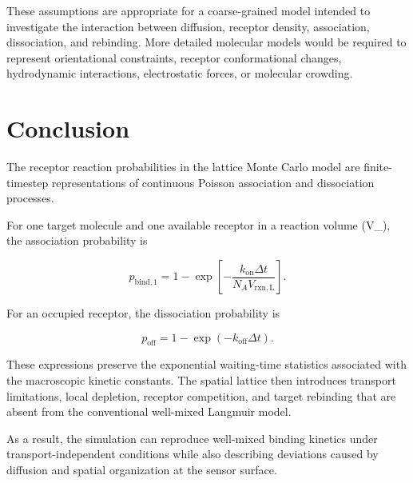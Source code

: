 \documentclass[11pt]{article}
\begin{document}
These assumptions are appropriate for a coarse-grained model intended to investigate the interaction between diffusion, receptor density, association, dissociation, and rebinding. More detailed molecular models would be required to represent orientational constraints, receptor conformational changes, hydrodynamic interactions, electrostatic forces, or molecular crowding.

\section{Conclusion}

The receptor reaction probabilities in the lattice Monte Carlo model are finite-timestep representations of continuous Poisson association and dissociation processes.

For one target molecule and one available receptor in a reaction volume (V_{}), the association probability is

\begin{equation}
\boxed{
p_{\mathrm{bind},1}
=
1-
\exp\left[
-
\frac{
k_{\mathrm{on}}\Delta t
}{
N_A V_{\mathrm{rxn,L}}
}
\right]
}.
\end{equation}

For an occupied receptor, the dissociation probability is

\begin{equation}
\boxed{
p_{\mathrm{off}}
=
1-\exp(-k_{\mathrm{off}}\Delta t)
}.
\end{equation}

These expressions preserve the exponential waiting-time statistics associated with the macroscopic kinetic constants. The spatial lattice then introduces transport limitations, local depletion, receptor competition, and target rebinding that are absent from the conventional well-mixed Langmuir model.

As a result, the simulation can reproduce well-mixed binding kinetics under transport-independent conditions while also describing deviations caused by diffusion and spatial organization at the sensor surface.
\end{document}

